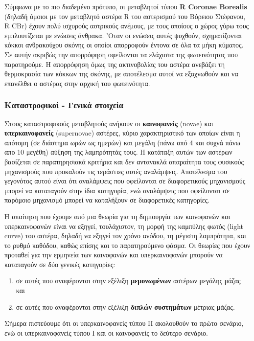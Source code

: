 Σύμφωνα με το πιο διαδεμένο πρότυπο, οι μεταβλητοί τύπου \textbf{R Coronae Borealis} (δηλαδή όμοιοι με τον μεταβλητό αστέρα R του αστερισμού του Βόρειου Στέφανου, R CBr) έχουν πολύ ισχυρούς αστρικούς ανέμους, με τους οποίους ο χώρος γύρω τους εμπλουτίζεται με ενώσεις άνθρακα. 'Οταν οι ενώσεις αυτές ψυχθούν, σχηματίζονται κόκκοι ανθρακούχου σκόνης οι οποίοι απορροφούν έντονα σε όλα τα μήκη κύματος. Σε αυτήν ακριβώς την απορρόφηση οφείλονται τα ελάχιστα της φωτεινότητας που παρατηρούμε. Η απορρόφηση όμως της ακτινοβολίας του αστέρα ανεβάζει τη θερμοκρασία των κόκκων της σκόνης, με αποτέλεσμα αυτοί να εξαχνωθούν και να επανέλθει ο αστέρας στην αρχική του φωτεινότητα.

\subsubsection{Καταστροφικοί - Γενικά στοιχεία}
Στους καταστροφικούς μεταβλητούς ανήκουν οι \textbf{καινοφανείς} (novae) και \textbf{υπερκαινοφανείς} (supernovae) αστέρες, κύριο χαρακτηριστικό των οποίων είναι η απότομη (σε διάστημα ωρών ως ημερών) και μεγάλη (πάνω από 4 και συχνά πάνω απο 10 μεγέθη) αύξηση της λαμπρότητάς τους. Η κατάταξη αυτών των αστέρων βασίζεται σε παρατηρησιακά κριτήρια και δεν αντανακλά απαραίτητα τους φυσικούς μηχανισμούς που προκαλούν τις τεράστιες αυτές αναλάμψεις. Αποτέλεσμα του γεγονότος αυτού είναι ότι αναλάμψεις που οφείλονται σε διαφορετικούς μηχανισμούς μπορεί να καταταγούν στην ίδια κατηγορία, ενώ αναλάμψεις που οφείλονται σε παρόμοιο μηχανισμό μπορεί να καταλήξουν σε διαφορετικές κατηγορίες.

Η απαίτηση που έχουμε από μια θεωρία για τη δημιουργία των καινοφανών και υπερκαινοφανών είναι να εξηγεί, τουλάχιστον, τη μορφή της καμπύλης φωτός (light curve) του αστέρα, δηλαδή να εξηγεί τον χρόνο ανόδου, τη μέγιστη λαμπρότητα, και το ρυθμό καθόδου, καθώς επίσης και το παρατηρούμενο φάσμα. Οι θεωρίες που έχουν προταθεί για την ερμηνεία των καινοφανών και υπερκαινοφανών μπορούν να καταταγούν σε δύο γενικές κατηγορίες:
\begin{enumerate}
    \item σε αυτές που αναφέρονται στην εξέλιξη \textbf{μεμονωμένων} αστέρων μεγάλης μάζας και
    \item σε αυτές που αναφέρονται στην εξέλιξη \textbf{διπλών συστημάτων} μέτριας μάζας.
\end{enumerate}
Σήμερα πιστεύουμε ότι οι υπερκαινοφανείς τύπου II ακολουθούν το πρώτο σενάριο, ενώ οι υπερκαινοφανείς τύπου I και οι καινοφανείς το δεύτερο σενάριο.

